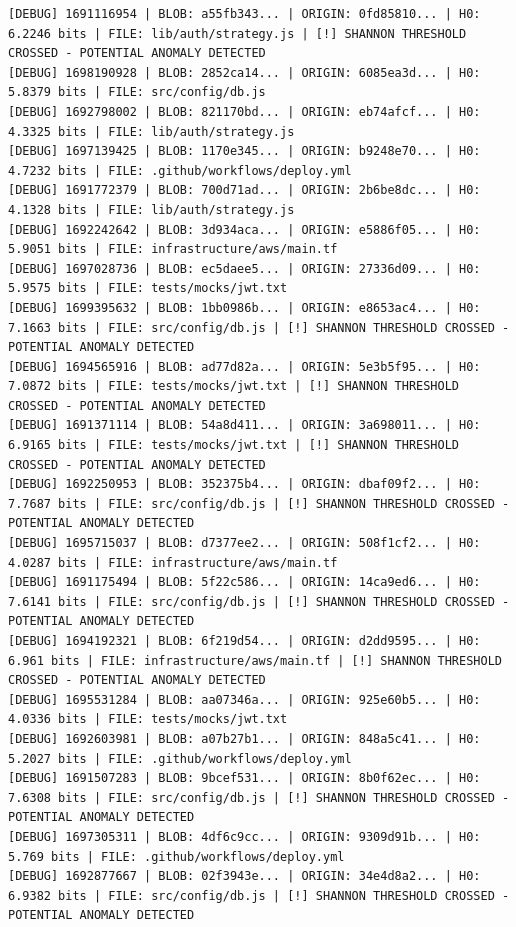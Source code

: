 \documentclass[12pt, a4paper, oneside]{report}
\begin{document}
\begin{lstlisting}[basicstyle=\tiny\ttfamily]
[DEBUG] 1691116954 | BLOB: a55fb343... | ORIGIN: 0fd85810... | H0: 6.2246 bits | FILE: lib/auth/strategy.js | [!] SHANNON THRESHOLD CROSSED - POTENTIAL ANOMALY DETECTED
[DEBUG] 1698190928 | BLOB: 2852ca14... | ORIGIN: 6085ea3d... | H0: 5.8379 bits | FILE: src/config/db.js
[DEBUG] 1692798002 | BLOB: 821170bd... | ORIGIN: eb74afcf... | H0: 4.3325 bits | FILE: lib/auth/strategy.js
[DEBUG] 1697139425 | BLOB: 1170e345... | ORIGIN: b9248e70... | H0: 4.7232 bits | FILE: .github/workflows/deploy.yml
[DEBUG] 1691772379 | BLOB: 700d71ad... | ORIGIN: 2b6be8dc... | H0: 4.1328 bits | FILE: lib/auth/strategy.js
[DEBUG] 1692242642 | BLOB: 3d934aca... | ORIGIN: e5886f05... | H0: 5.9051 bits | FILE: infrastructure/aws/main.tf
[DEBUG] 1697028736 | BLOB: ec5daee5... | ORIGIN: 27336d09... | H0: 5.9575 bits | FILE: tests/mocks/jwt.txt
[DEBUG] 1699395632 | BLOB: 1bb0986b... | ORIGIN: e8653ac4... | H0: 7.1663 bits | FILE: src/config/db.js | [!] SHANNON THRESHOLD CROSSED - POTENTIAL ANOMALY DETECTED
[DEBUG] 1694565916 | BLOB: ad77d82a... | ORIGIN: 5e3b5f95... | H0: 7.0872 bits | FILE: tests/mocks/jwt.txt | [!] SHANNON THRESHOLD CROSSED - POTENTIAL ANOMALY DETECTED
[DEBUG] 1691371114 | BLOB: 54a8d411... | ORIGIN: 3a698011... | H0: 6.9165 bits | FILE: tests/mocks/jwt.txt | [!] SHANNON THRESHOLD CROSSED - POTENTIAL ANOMALY DETECTED
[DEBUG] 1692250953 | BLOB: 352375b4... | ORIGIN: dbaf09f2... | H0: 7.7687 bits | FILE: src/config/db.js | [!] SHANNON THRESHOLD CROSSED - POTENTIAL ANOMALY DETECTED
[DEBUG] 1695715037 | BLOB: d7377ee2... | ORIGIN: 508f1cf2... | H0: 4.0287 bits | FILE: infrastructure/aws/main.tf
[DEBUG] 1691175494 | BLOB: 5f22c586... | ORIGIN: 14ca9ed6... | H0: 7.6141 bits | FILE: src/config/db.js | [!] SHANNON THRESHOLD CROSSED - POTENTIAL ANOMALY DETECTED
[DEBUG] 1694192321 | BLOB: 6f219d54... | ORIGIN: d2dd9595... | H0: 6.961 bits | FILE: infrastructure/aws/main.tf | [!] SHANNON THRESHOLD CROSSED - POTENTIAL ANOMALY DETECTED
[DEBUG] 1695531284 | BLOB: aa07346a... | ORIGIN: 925e60b5... | H0: 4.0336 bits | FILE: tests/mocks/jwt.txt
[DEBUG] 1692603981 | BLOB: a07b27b1... | ORIGIN: 848a5c41... | H0: 5.2027 bits | FILE: .github/workflows/deploy.yml
[DEBUG] 1691507283 | BLOB: 9bcef531... | ORIGIN: 8b0f62ec... | H0: 7.6308 bits | FILE: src/config/db.js | [!] SHANNON THRESHOLD CROSSED - POTENTIAL ANOMALY DETECTED
[DEBUG] 1697305311 | BLOB: 4df6c9cc... | ORIGIN: 9309d91b... | H0: 5.769 bits | FILE: .github/workflows/deploy.yml
[DEBUG] 1692877667 | BLOB: 02f3943e... | ORIGIN: 34e4d8a2... | H0: 6.9382 bits | FILE: src/config/db.js | [!] SHANNON THRESHOLD CROSSED - POTENTIAL ANOMALY DETECTED

\end{lstlisting}
\end{document}
